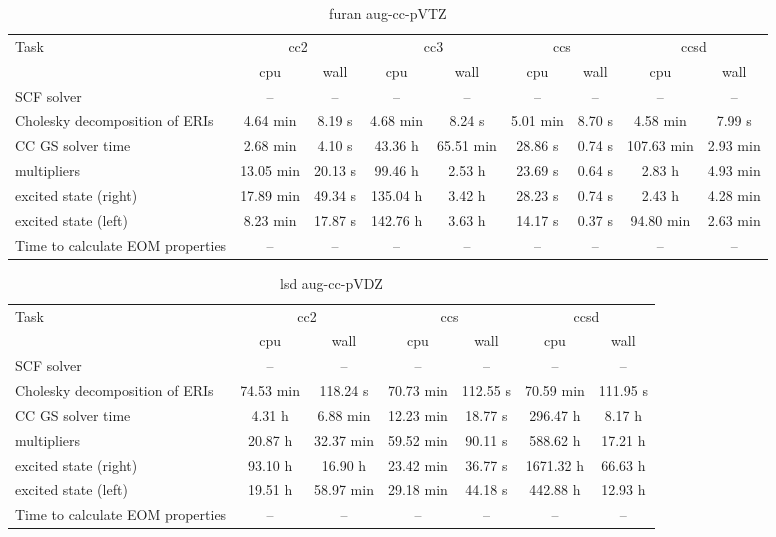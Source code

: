 \documentclass{article}
\begin{document}
\begin{table}
\caption{furan aug-cc-pVTZ}
\begin{tabular}{lcccccccc}
\toprule
Task & \multicolumn{2}{c}{cc2} & \multicolumn{2}{c}{cc3} & \multicolumn{2}{c}{ccs} & \multicolumn{2}{c}{ccsd}\\
\cmidrule(lr){2-3}\cmidrule(lr){4-5}\cmidrule(lr){6-7}\cmidrule(lr){8-9}
 & cpu & wall & cpu & wall & cpu & wall & cpu & wall\\
\midrule
SCF solver & -- & -- & -- & -- & -- & -- & -- & --\\
Cholesky decomposition of ERIs & 4.64 min & 8.19 s & 4.68 min & 8.24 s & 5.01 min & 8.70 s & 4.58 min & 7.99 s\\
CC GS solver time & 2.68 min & 4.10 s & 43.36 h & 65.51 min & 28.86 s & 0.74 s & 107.63 min & 2.93 min\\
multipliers & 13.05 min & 20.13 s & 99.46 h & 2.53 h & 23.69 s & 0.64 s & 2.83 h & 4.93 min\\
excited state (right) & 17.89 min & 49.34 s & 135.04 h & 3.42 h & 28.23 s & 0.74 s & 2.43 h & 4.28 min\\
excited state (left) & 8.23 min & 17.87 s & 142.76 h & 3.63 h & 14.17 s & 0.37 s & 94.80 min & 2.63 min\\
Time to calculate EOM properties & -- & -- & -- & -- & -- & -- & -- & --\\
\bottomrule
\end{tabular}
\end{table}
\begin{table}
\caption{lsd aug-cc-pVDZ}
\begin{tabular}{lcccccc}
\toprule
Task & \multicolumn{2}{c}{cc2} & \multicolumn{2}{c}{ccs} & \multicolumn{2}{c}{ccsd}\\
\cmidrule(lr){2-3}\cmidrule(lr){4-5}\cmidrule(lr){6-7}
 & cpu & wall & cpu & wall & cpu & wall\\
\midrule
SCF solver & -- & -- & -- & -- & -- & --\\
Cholesky decomposition of ERIs & 74.53 min & 118.24 s & 70.73 min & 112.55 s & 70.59 min & 111.95 s\\
CC GS solver time & 4.31 h & 6.88 min & 12.23 min & 18.77 s & 296.47 h & 8.17 h\\
multipliers & 20.87 h & 32.37 min & 59.52 min & 90.11 s & 588.62 h & 17.21 h\\
excited state (right) & 93.10 h & 16.90 h & 23.42 min & 36.77 s & 1671.32 h & 66.63 h\\
excited state (left) & 19.51 h & 58.97 min & 29.18 min & 44.18 s & 442.88 h & 12.93 h\\
Time to calculate EOM properties & -- & -- & -- & -- & -- & --\\
\bottomrule
\end{tabular}
\end{table}
\end{document}
